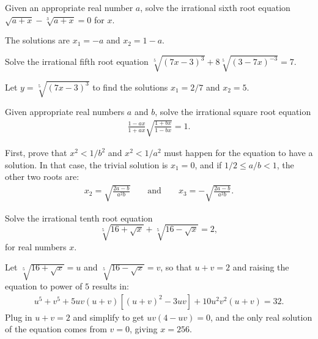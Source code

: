 \begin{question}\label{p:irrational-G}
    Given an appropriate real number $a$, solve the irrational sixth root equation $\sqrt{a+x}-\sqrt[3]{a+x}=0$ for $x$.
\end{question}

\begin{solution}
    The solutions are $x_1=-a$ and $x_2=1-a$.
\end{solution}


\begin{question}\label{p:irrational-H}
    Solve the irrational fifth root equation $\sqrt[5]{(7x-3)^3}+8\sqrt[5]{(3-7x)^{-3}}=7$.
\end{question}

\begin{solution}
    Let $y=\sqrt[5]{(7x-3)^3}$ to find the solutions $x_1=2/7$ and $x_2=5$.
\end{solution}

\begin{question}\label{p:irrational-I}
    Given appropriate real numbers $a$ and $b$, solve the irrational square root equation
    \begin{align*}
        \frac{1-ax}{1+ax}\sqrt{\frac{1+bx}{1-bx}}=1.
    \end{align*}
\end{question}

\begin{solution}
    First, prove that $x^2<1/b^2$ and $x^2<1/a^2$ must happen for the equation to have a solution. In that case, the trivial solution is $x_1=0$, and if $1/2 \leq a/b < 1$, the other two roots are:
    \begin{align*}
        x_2 = \sqrt{\frac{2a-b}{a^2b}} \qquad \text{and} \qquad x_3 = -\sqrt{\frac{2a-b}{a^2b}}.
    \end{align*}
\end{solution}


\begin{question}\label{p:irrational-J}
    Solve the irrational tenth root equation \[\sqrt[5]{16+\sqrt{x}}+\sqrt[5]{16-\sqrt{x}}=2,\] for real numbers $x$.
\end{question}

\begin{solution}
    Let $\sqrt[5]{16+\sqrt{x}}=u$ and $\sqrt[5]{16-\sqrt{x}}=v$, so that $u+v=2$ and raising the equation to power of $5$ results in:
    \begin{align*}
        u^5+v^5+5uv(u+v)\left[(u+v)^2-3uv\right]+10u^2v^2(u+v)=32.
    \end{align*}
    Plug in $u+v=2$ and simplify to get $uv(4-uv)=0$, and the only real solution of the equation comes from $v=0$, giving $x=256$.
\end{solution}


